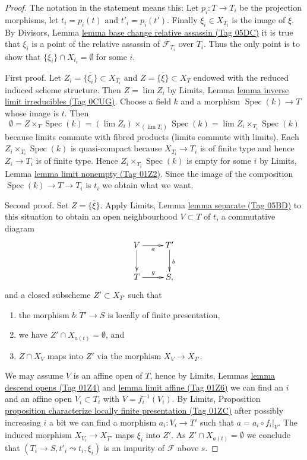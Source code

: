 \documentclass{amsart}
\theoremstyle{plain}
\theoremstyle{definition}
\theoremstyle{remark}
\numberwithin{equation}{subsection}
\def\lim{\mathop{\mathrm{lim}}\nolimits}
\def\Spec{\mathop{\mathrm{Spec}}}
\begin{document}
\begin{proof}
The notation in the statement means this: Let $p_i : T \to T_i$
be the projection morphisms, let $t_i = p_i(t)$ and $t'_i = p_i(t')$.
Finally $\xi_i \in X_{T_i}$ is the image of $\xi$. By
Divisors, Lemma \href{https://stacks.math.columbia.edu/tag/05DC}{lemma base change relative assassin (Tag 05DC)}
it is true that $\xi_i$ is a point of the relative
assassin of $\mathcal{F}_{T_i}$ over $T_i$. Thus the only point is to
show that $\overline{\{\xi_i\}} \cap X_{t_i} = \emptyset$ for some $i$.

\medskip\noindent
First proof. Let $Z_i = \overline{\{\xi_i\}} \subset X_{T_i}$
and $Z = \overline{\{\xi\}} \subset X_T$
endowed with the reduced induced scheme structure.
Then $Z = \lim Z_i$ by
Limits, Lemma \href{https://stacks.math.columbia.edu/tag/0CUG}{lemma inverse limit irreducibles (Tag 0CUG)}.
Choose a field $k$ and a morphism $\Spec(k) \to T$ whose image is $t$.
Then
$$
\emptyset =
Z \times_T \Spec(k) = (\lim Z_i) \times_{(\lim T_i)} \Spec(k)
= \lim Z_i \times_{T_i} \Spec(k)
$$
because limits commute with fibred products (limits commute with limits).
Each $Z_i \times_{T_i} \Spec(k)$ is quasi-compact because $X_{T_i} \to T_i$
is of finite type and hence $Z_i \to T_i$ is of finite type.
Hence $Z_i \times_{T_i} \Spec(k)$ is empty for some $i$ by
Limits, Lemma \href{https://stacks.math.columbia.edu/tag/01Z2}{lemma limit nonempty (Tag 01Z2)}.
Since the image of the composition $\Spec(k) \to T \to T_i$ is $t_i$
we obtain what we want.

\medskip\noindent
Second proof. Set $Z = \overline{\{\xi\}}$. Apply
Limits, Lemma \href{https://stacks.math.columbia.edu/tag/05BD}{lemma separate (Tag 05BD)}
to this situation to obtain an open neighbourhood
$V \subset T$ of $t$, a commutative diagram
$$
\xymatrix{
V \ar[d] \ar[r]_a & T' \ar[d]^b \\
T \ar[r]^g & S,
}
$$
and a closed subscheme $Z' \subset X_{T'}$ such that
\begin{enumerate}
\item the morphism $b : T' \to S$ is locally of finite presentation,
\item we have $Z' \cap X_{a(t)} = \emptyset$, and
\item $Z \cap X_V$ maps into $Z'$ via the morphism $X_V \to X_{T'}$.
\end{enumerate}
We may assume $V$ is an affine open of $T$, hence by
Limits, Lemmas \href{https://stacks.math.columbia.edu/tag/01Z4}{lemma descend opens (Tag 01Z4)} and
\href{https://stacks.math.columbia.edu/tag/01Z6}{lemma limit affine (Tag 01Z6)}
we can find an $i$ and an affine open $V_i \subset T_i$ with
$V = f_i^{-1}(V_i)$. By
Limits,
Proposition \href{https://stacks.math.columbia.edu/tag/01ZC}{proposition characterize locally finite presentation (Tag 01ZC)}
after possibly increasing $i$ a bit we can find a morphism
$a_i : V_i \to T'$ such that $a = a_i \circ f_i|_V$.
The induced morphism $X_{V_i} \to X_{T'}$ maps $\xi_i$ into
$Z'$. As $Z' \cap X_{a(t)} = \emptyset$ we conclude that
$(T_i \to S, t'_i \leadsto t_i, \xi_i)$ is an impurity of
$\mathcal{F}$ above $s$.
\end{proof}
\end{document}

